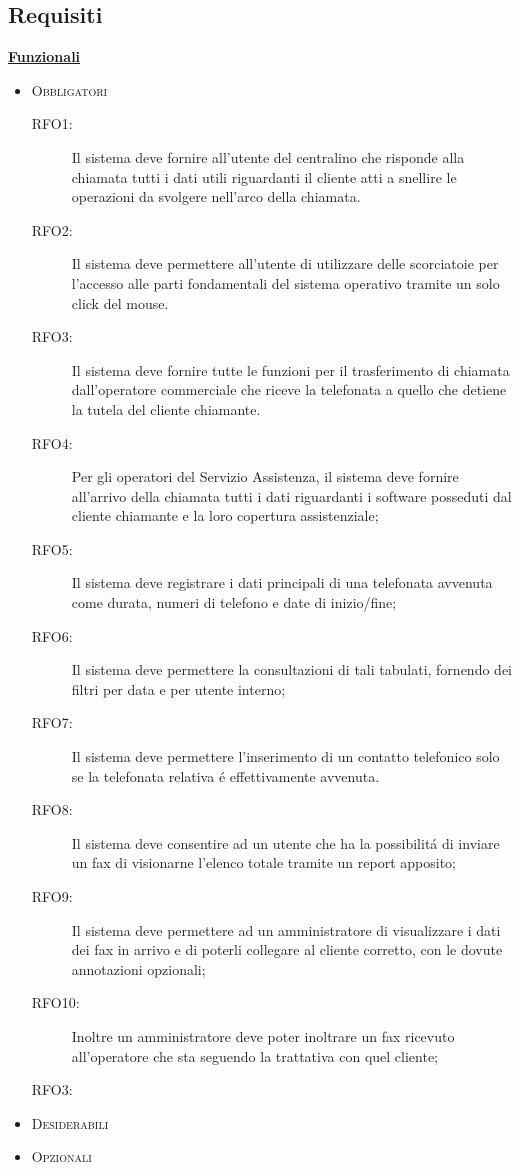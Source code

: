 \subsection{Requisiti}
\underline{\textbf{Funzionali}}
\begin{itemize}
 \item \textsc{Obbligatori}
	 \begin{description}
	  \item[RFO1:] Il sistema deve fornire all'utente del centralino che risponde alla chiamata tutti i dati utili riguardanti il cliente atti
a snellire le operazioni da svolgere nell'arco della chiamata.
	  \item[RFO2:] Il sistema deve permettere all'utente di utilizzare delle scorciatoie per l'accesso alle parti fondamentali del sistema operativo
tramite un solo click del mouse.
	  \item[RFO3:] Il sistema deve fornire tutte le funzioni per il trasferimento di chiamata dall'operatore commerciale che riceve la telefonata 
a quello che detiene la tutela del cliente chiamante.
\item[RFO4:] Per gli operatori del Servizio Assistenza, il sistema deve fornire all'arrivo della chiamata tutti i dati riguardanti i software 
posseduti dal cliente chiamante e la loro copertura assistenziale;
\item[RFO5:] Il sistema deve registrare i dati principali di una telefonata avvenuta come durata, numeri di telefono e date di inizio/fine;
\item[RFO6:] Il sistema deve permettere la consultazioni di tali tabulati, fornendo dei filtri per data e per utente interno;
\item[RFO7:] Il sistema deve permettere l'inserimento di un contatto telefonico solo se la telefonata relativa \'e effettivamente 
avvenuta.
\item[RFO8:] Il sistema deve consentire ad un utente che ha la possibilit\'a di inviare un fax di visionarne l'elenco totale tramite un report 
apposito;
\item[RFO9:] Il sistema deve permettere ad un amministratore di visualizzare i dati dei fax in arrivo e di poterli collegare al cliente corretto, 
con le dovute annotazioni opzionali;
\item[RFO10:] Inoltre un amministratore deve poter inoltrare un fax ricevuto all'operatore che sta seguendo la trattativa con quel cliente;

\item[RFO3:] 
 	\end{description}

\item \textsc{Desiderabili}
\item \textsc{Opzionali}


\end{itemize}

